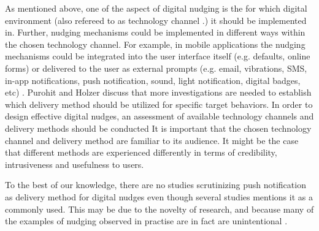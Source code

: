 \bigbreak
 As mentioned above, one of the aspect of digital nudging is the for which digital environment (also refereed to as technology channel \cite{mirsch_making_2018}.) it should be implemented in. Further, nudging mechanisms could be implemented in different ways within the chosen technology channel. For example, in mobile applications the nudging mechanisms could be integrated into the user interface itself (e.g. defaults, online forms) or delivered to the user as external prompts (e.g. email, vibrations, SMS, in-app notifications, push notification, sound, light notification, digital badges, etc) \cite{purohit_functional_2019}.
Purohit and Holzer \cite{purohit_functional_2019}
discuss that more investigations are needed to establish which delivery method should be utilized for specific target behaviors. In order to design effective digital nudges, an assessment of available technology channels and delivery methods should be conducted\cite{mirsch_making_2018}
It is important that the chosen technology channel and delivery method are familiar to its audience. It might be the case that different methods are experienced differently in terms of credibility, intrusiveness and usefulness to users. %


To the best of our knowledge, there are no studies scrutinizing push notification as delivery method for digital nudges even though several studies mentions it as a commonly used\cite{dhar_persuasive_2017}. This may be due to the novelty of research, and because many of the examples of nudging observed in practise are in fact are unintentional \cite{mirsch_digital_2017}. 



